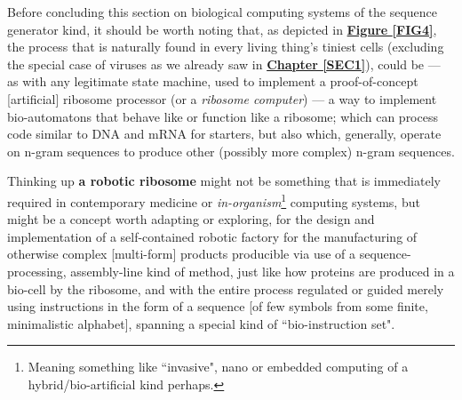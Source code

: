 \documentclass[a4paper, 18pt]{book} %
\begin{document}
Before concluding this section on biological computing systems of the sequence generator kind\cite{lutalo2025transformatic}, it should be worth noting that, as depicted in \textbf{\hyperref[FIG4]{Figure \ref{FIG4}}}, the process that is naturally found in every living thing's tiniest cells (excluding the special case of viruses as we already saw in \textbf{\hyperref[SEC1]{Chapter \ref{SEC1}}}), could be --- as with any legitimate state machine,  used to implement a proof-of-concept [artificial] ribosome processor (or a \textit{ribosome computer}) --- a way to implement bio-automatons that behave like or function like a ribosome; which can process code similar to DNA and mRNA for starters, but also which, generally, operate on n-gram sequences to produce other (possibly more complex) n-gram sequences. 

Thinking up \textbf{a robotic ribosome} might not be something that is immediately required in contemporary medicine or \textit{in-organism}\footnote{Meaning something like ``invasive", nano or embedded computing of a hybrid/bio-artificial kind perhaps.} computing systems, but might be a concept worth adapting or exploring, for the design and implementation of a self-contained robotic factory for the manufacturing of otherwise complex [multi-form] products producible via use of a sequence-processing, assembly-line kind of method, just like how proteins are produced in a bio-cell by the ribosome, and with the entire process regulated or guided merely using instructions in the form of a sequence [of few symbols from some finite, minimalistic alphabet], spanning a special kind of ``bio-instruction set".
\end{document}
